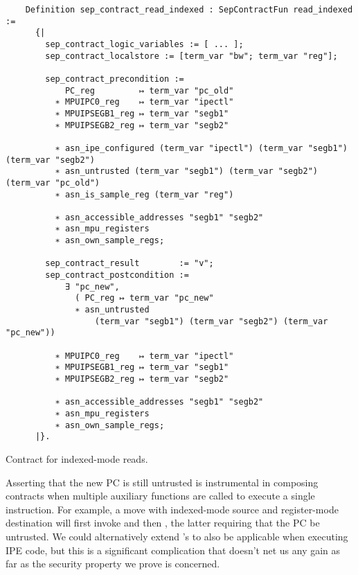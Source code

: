 \begin{listing}
  \begin{verbatim}
    Definition sep_contract_read_indexed : SepContractFun read_indexed :=
      {|
        sep_contract_logic_variables := [ ... ];
        sep_contract_localstore := [term_var "bw"; term_var "reg"];

        sep_contract_precondition :=
            PC_reg         ↦ term_var "pc_old"
          ∗ MPUIPC0_reg    ↦ term_var "ipectl"
          ∗ MPUIPSEGB1_reg ↦ term_var "segb1"
          ∗ MPUIPSEGB2_reg ↦ term_var "segb2"

          ∗ asn_ipe_configured (term_var "ipectl") (term_var "segb1") (term_var "segb2")
          ∗ asn_untrusted (term_var "segb1") (term_var "segb2") (term_var "pc_old")
          ∗ asn_is_sample_reg (term_var "reg")

          ∗ asn_accessible_addresses "segb1" "segb2"
          ∗ asn_mpu_registers
          ∗ asn_own_sample_regs;

        sep_contract_result        := "v";
        sep_contract_postcondition :=
            ∃ "pc_new",
              ( PC_reg ↦ term_var "pc_new"
              ∗ asn_untrusted
                  (term_var "segb1") (term_var "segb2") (term_var "pc_new"))

          ∗ MPUIPC0_reg    ↦ term_var "ipectl"
          ∗ MPUIPSEGB1_reg ↦ term_var "segb1"
          ∗ MPUIPSEGB2_reg ↦ term_var "segb2"

          ∗ asn_accessible_addresses "segb1" "segb2"
          ∗ asn_mpu_registers
          ∗ asn_own_sample_regs;
      |}.
  \end{verbatim}
  \caption{Contract for indexed-mode reads.}
  \label{lst:read_indexed}
\end{listing}

Asserting that the new PC is still untrusted is instrumental in composing contracts when multiple auxiliary functions are called to execute a single instruction. For example, a move with indexed-mode source and register-mode destination will first invoke  and then , the latter requiring that the PC be untrusted. We could alternatively extend 's to also be applicable when executing IPE code, but this is a significant complication that doesn't net us any gain as far as the security property we prove is concerned.


